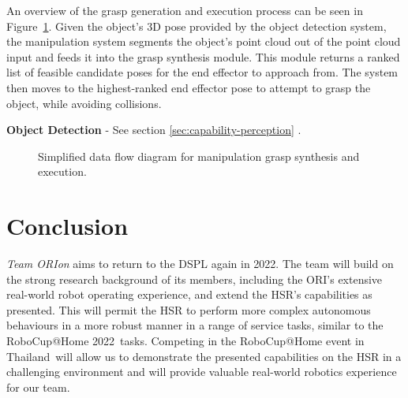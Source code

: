\documentclass[runningheads,a4paper]{llncs}
\newcommand{\robospecs}{%
  \newpage%
  \pagenumbering{gobble}%
}
\newcommand{\teamori}{Team ORIon}
\newcommand{\competitionyear}{2022}
\newcommand{\competitioncountry}{Thailand}
\begin{document}
An overview of the grasp generation and execution process can be seen in Figure~\ref{fig:manipulation_data_flow}.
%
Given the object's 3D pose provided by the object detection system, the manipulation system segments the object's point cloud out of the point cloud input and feeds it into the grasp synthesis module.
%
This module returns a ranked list of feasible candidate poses for the end effector to approach from.
%
The system then moves to the highest-ranked end effector pose to attempt to grasp the object, while avoiding collisions.

\textbf{Object Detection} - See section \ref{sec:capability-perception} . 

\begin{figure}[!t]
	\centering
	\vspace{-10pt}%
	\caption{Simplified data flow diagram for manipulation grasp synthesis and execution.}
	\label{fig:manipulation_data_flow}
	\vspace{-3ex}
\end{figure}


\section{Conclusion}
\textit{\teamori{}} aims to return to the DSPL again in \competitionyear. The team will build on the strong research background of its members, including the ORI's extensive real-world robot operating experience, and extend the HSR's capabilities as presented. This will permit the HSR to perform more complex autonomous behaviours in a more robust manner in a range of service tasks, similar to the RoboCup@Home \competitionyear\ tasks. 
Competing in the RoboCup@Home event in \competitioncountry\ will allow us to demonstrate the presented capabilities on the HSR in a challenging environment and will provide valuable real-world robotics experience for our team.





\robospecs

\end{document}
